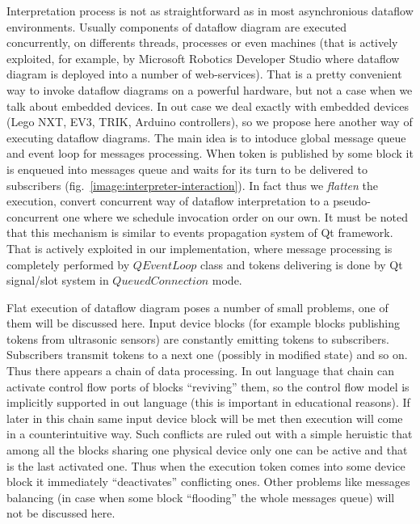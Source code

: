 \documentclass[conference,compsoc]{IEEEtran}
\begin{document}
Interpretation process is not as straightforward as in most asynchronious dataflow environments. Usually components of dataflow diagram are executed concurrently, on differents threads, processes or even machines (that is actively exploited, for example, by Microsoft Robotics Developer Studio where dataflow diagram is deployed into a number of web-services). That is a pretty convenient way to invoke dataflow diagrams on a powerful hardware, but not a case when we talk about embedded devices. In out case we deal exactly with embedded devices (Lego NXT, EV3, TRIK, Arduino controllers), so we propose here another way of executing dataflow diagrams. The main idea is to intoduce global message queue and event loop for messages processing. When token is published by some block it is enqueued into messages queue and waits for its turn to be delivered to subscribers (fig.~\ref{image:interpreter-interaction}). In fact thus we \textit{flatten} the execution, convert concurrent way of dataflow interpretation to a pseudo-concurrent one where we schedule invocation order on our own. It must be noted that this mechanism is similar to events propagation system of Qt framework. That is actively exploited in our implementation, where message processing is completely performed by $QEventLoop$ class and tokens delivering is done by Qt signal/slot system in $QueuedConnection$ mode. 

Flat execution of dataflow diagram poses a number of small problems, one of them will be discussed here. Input device blocks (for example blocks publishing tokens from ultrasonic sensors) are constantly emitting tokens to subscribers. Subscribers transmit tokens to a next one (possibly in modified state) and so on. Thus there appears a chain of data processing. In out language that chain can activate control flow ports of blocks ``reviving'' them, so the control flow model is implicitly supported in out language (this is important in educational reasons). If later in this chain same input device block will be met then execution will come in a 
counterintuitive way. Such conflicts are ruled out with a simple heruistic that among all the blocks sharing one physical device only one can be active and that is the last activated one. Thus when the execution token comes into some device block it immediately ``deactivates'' conflicting ones. Other problems like messages balancing (in case when some block ``flooding'' the whole messages queue) will not be discussed here.
\end{document}
